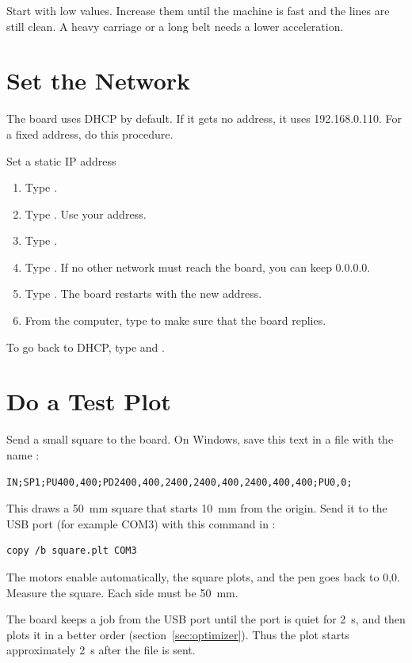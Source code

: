 Start with low values. Increase them until the machine is fast and the lines
are still clean. A heavy carriage or a long belt needs a lower acceleration.

\section{Set the Network}

The board uses DHCP by default. If it gets no address, it uses
192.168.0.110. For a fixed address, do this procedure.

\begin{procedure}{Set a static IP address}
\begin{enumerate}
  \item Type .
  \item Type . Use your address.
  \item Type .
  \item Type . If no other network must reach the
        board, you can keep 0.0.0.0.
  \item Type . The board restarts with the new address.
  \item From the computer, type  to make sure that the
        board replies.
\end{enumerate}
\end{procedure}

To go back to DHCP, type  and .

\section{Do a Test Plot}

Send a small square to the board. On Windows, save this text in a file with
the name :

\begin{lstlisting}[language=hpgl]
IN;SP1;PU400,400;PD2400,400,2400,2400,400,2400,400,400;PU0,0;
\end{lstlisting}

This draws a \SI{50}{mm} square that starts \SI{10}{mm} from the origin.
Send it to the USB port (for example COM3) with this command in
:

\begin{lstlisting}[language=console]
copy /b square.plt COM3
\end{lstlisting}

The motors enable automatically, the square plots, and the pen goes back to
0,0. Measure the square. Each side must be \SI{50}{mm}.

\begin{note}
\notelabel The board keeps a job from the USB port until the port is quiet
for 2~s, and then plots it in a better order (section~\ref{sec:optimizer}).
Thus the plot starts approximately 2~s after the file is sent.
\end{note}
